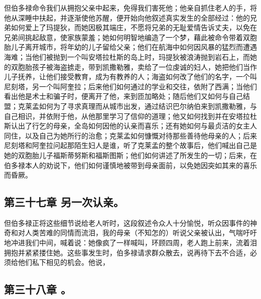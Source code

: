 但伯多禄命令我们从拥抱父亲中起来，免得我们害死他；他亲自抓住老人的手，将他从深睡中扶起，并逐渐使他苏醒，便开始向他叙述真实发生的全部经过：他的兄弟如何爱上了玛提狄，而她因极其端庄，不愿将兄弟的无耻爱情告诉丈夫，以免在兄弟间挑起敌意，使家族蒙羞；她如何明智地编造了一个梦，藉此被命令带着双胞胎儿子离开城市，将年幼的儿子留给父亲；他们在航海中如何因风暴的猛烈而遭遇海难；当他们被抛到一个叫安塔拉杜斯的岛上时，玛提狄被浪涛抛到岩石上，而她的双胞胎孩子被海盗掳走，带到凯撒勒雅，卖给了一位虔诚的妇人，她把他们当作儿子抚养，让他们接受教育，成为有教养的人；海盗如何改了他们的名字，一个叫尼刻塔，另一个叫阿奎拉；后来他们如何通过的学业和交往，依附了西满；当他们看出他是术士和骗子时，便离开了他，来到匝加略处；随后他们又如何与自己结盟；克莱孟如何为了寻求真理而从城市出发，通过结识巴尔纳伯来到凯撒勒雅，与自己相识，并依附于他，从他那里学习了信仰的道理；他又如何找到并在安塔拉杜斯认出了行乞的母亲，全岛如何因他的认亲而喜乐；还有她如何与最贞洁的女主人同住，以及自己为她所行的治愈；克莱孟如何慷慨对待那些善待他母亲的人；后来尼刻塔和阿奎拉问起那陌生妇人是谁，听了克莱孟的整个故事后，他们喊出自己是她的双胞胎儿子福斯蒂努斯和福斯图斯；他们如何讲述了所发生的一切；后来，在伯多禄本人的劝说下，他们如何谨慎地被带到母亲面前，以免她因突如其来的喜乐而昏厥。\par


\subsection{第三十七章 另一次认亲。}

但伯多禄正将这些细节说给老人听时，这段叙述令众人十分愉悦，听众因事件的神奇和对人类苦难的同情而流泪，我的母亲（不知怎的）听说父亲被认出，气喘吁吁地冲进我们中间，喊着说：她像疯了一样喊叫，环顾四周，老人跑上前来，流着泪拥抱并紧紧搂住她。这些事发生时，伯多禄请求群众散去，说再待下去不合适，必须给他们私下相见的机会。他说，\par


\subsection{第三十八章 。}

